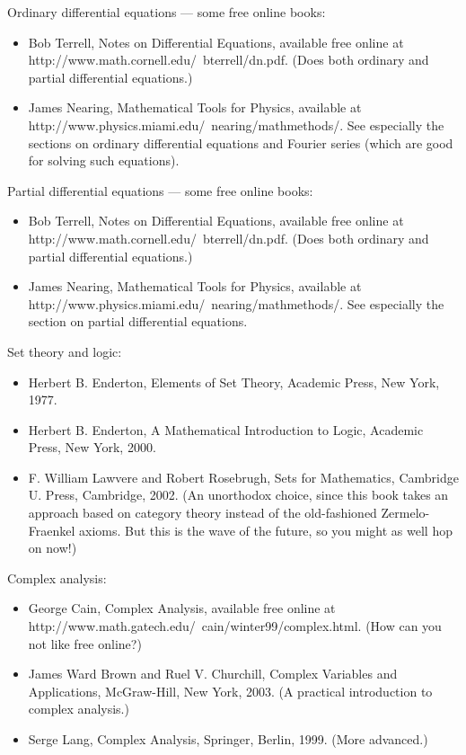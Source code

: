 \documentclass[10pt,a4paper]{book}
\theoremstyle{definition}
\begin{document}
Ordinary differential equations — some free online books:

\begin{itemize}
\item Bob Terrell, Notes on Differential Equations, available free online at http://www.math.cornell.edu/~bterrell/dn.pdf. (Does both ordinary and partial differential equations.)

\item James Nearing, Mathematical Tools for Physics, available at http://www.physics.miami.edu/~nearing/mathmethods/. See especially the sections on ordinary differential equations and Fourier series (which are good for solving such equations).
\end{itemize}

Partial differential equations — some free online books:

\begin{itemize}
\item Bob Terrell, Notes on Differential Equations, available free online at http://www.math.cornell.edu/~bterrell/dn.pdf. (Does both ordinary and partial differential equations.)

\item James Nearing, Mathematical Tools for Physics, available at http://www.physics.miami.edu/~nearing/mathmethods/. See especially the section on partial differential equations.
\end{itemize}

Set theory and logic:

\begin{itemize}
\item Herbert B. Enderton, Elements of Set Theory, Academic Press, New York, 1977.

\item Herbert B. Enderton, A Mathematical Introduction to Logic, Academic Press, New York, 2000.

\item F. William Lawvere and Robert Rosebrugh, Sets for Mathematics, Cambridge U. Press, Cambridge, 2002. (An unorthodox choice, since this book takes an approach based on category theory instead of the old-fashioned Zermelo-Fraenkel axioms. But this is the wave of the future, so you might as well hop on now!)
\end{itemize}

Complex analysis:

\begin{itemize}
\item George Cain, Complex Analysis, available free online at http://www.math.gatech.edu/~cain/winter99/complex.html. (How can you not like free online?)

\item James Ward Brown and Ruel V. Churchill, Complex Variables and Applications, McGraw-Hill, New York, 2003. (A practical introduction to complex analysis.)

\item Serge Lang, Complex Analysis, Springer, Berlin, 1999. (More advanced.)
\end{itemize}
\end{document}
